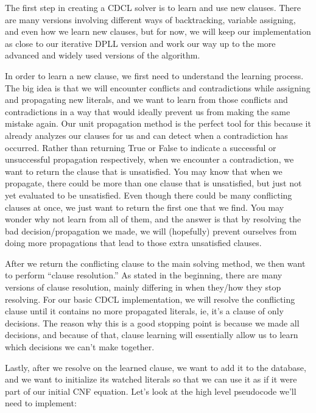The first step in creating a CDCL solver is to learn and use new clauses. There are 
many versions involving different ways of backtracking, variable assigning, and even 
how we learn new clauses, but for now, we will keep our implementation as close to 
our iterative DPLL version and work our way up to the more advanced and widely used 
versions of the algorithm. 

In order to learn a new clause, we first need to understand the learning process. 
The big idea is that we will encounter conflicts and contradictions while assigning 
and propagating new literals, and we want to learn from those conflicts and contradictions 
in a way that would ideally prevent us from making the same mistake again. Our unit 
propagation method is the perfect tool for this because it already analyzes our clauses 
for us and can detect when a contradiction has occurred. Rather than returning True or 
False to indicate a successful or unsuccessful propagation respectively, when we 
encounter a contradiction, we want to return the clause that is unsatisfied. You may know that
when we propagate, there could be more than one clause that is unsatisfied, but just not 
yet evaluated to be unsatisfied. Even though there could be many conflicting clauses at
once, we just want to return the first one that we find. You may wonder why not learn from 
all of them, and the answer is that by resolving the bad decision/propagation we made, 
we will (hopefully) prevent ourselves from doing more propagations that lead to those 
extra unsatisfied clauses.

After we return the conflicting clause to the main solving method, we then want to 
perform ``clause resolution.'' As stated in the beginning, there are many versions of 
clause resolution, mainly differing in when they/how they stop resolving. For our basic 
CDCL implementation, we will resolve the conflicting clause until it contains no more 
propagated literals, ie, it's a clause of only decisions. The reason why this is a good 
stopping point is because we made all decisions, and because of that, clause learning 
will essentially allow us to learn which decisions we can't make together. 

Lastly, after we resolve on the learned clause, we want to add it to the database,
and we want to initialize its watched literals so that we can use it as if it were 
part of our initial CNF equation. Let's look at the high level pseudocode we'll need 
to implement:

